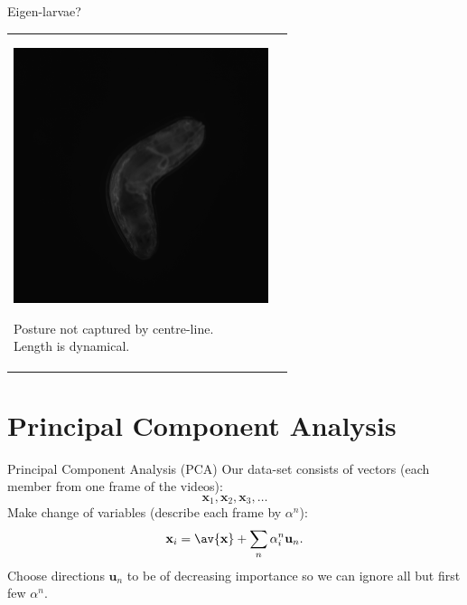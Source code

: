 \documentclass{beamer}
\begin{document}
\begin{frame}{Eigen-larvae?}
%
\begin{tabular}{ll}
   \parbox{7.5cm}{\includegraphics[width=74.60mm]{larva}}
   \parbox{4cm}{Posture not captured by centre-line.\\[0.5cm]
    Length is dynamical.}
 \end{tabular}

%
\end{frame}


\section{Principal Component Analysis}


\begin{frame}{Principal Component Analysis (PCA)}
%
 Our data-set consists of vectors (each member from one frame of the videos):
 \begin{equation*}
   \mathbf{x}_1,\mathbf{x}_2,\mathbf{x}_3,\ldots
 \end{equation*}
 Make change of variables (describe each frame by $\alpha^n$):
 \begin{equation*}
   \mathbf{x}_i = \av{\mathbf{x}} + \sum_n \alpha^n_i \mathbf{u}_n.
 \end{equation*}
 Choose directions $\mathbf{u}_n$ to be of decreasing importance so we can ignore all but first few $\alpha^n$.
%
\end{frame}

\end{document}
